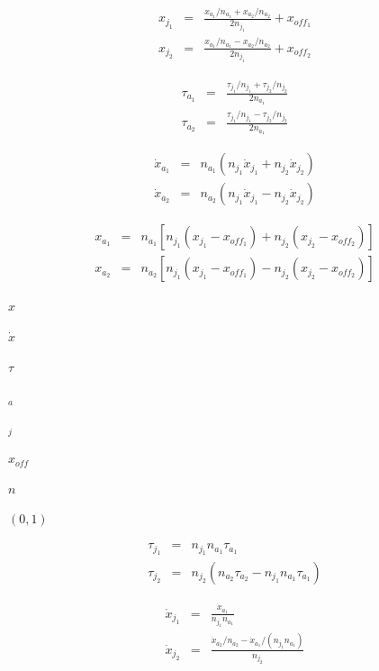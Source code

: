 \documentclass{article}
\begin{document}
\begin{eqnarray*}
x_{j_1} & = & \frac{ x_{a_1} / n_{a_1} + x_{a_2} / n_{a_2} }{2 n_{j_1}}  + x_{off_1} \\[1em]
x_{j_2} & = & \frac{ x_{a_1} / n_{a_1} - x_{a_2} / n_{a_2} }{2 n_{j_1}}  + x_{off_2}
\end{eqnarray*}
\pagebreak

\begin{eqnarray*}
\tau_{a_1} & = & \frac{ \tau_{j_1} / n_{j_1} + \tau_{j_2} / n_{j_2} }{2 n_{a_1}} \\[1em]
\tau_{a_2} & = & \frac{ \tau_{j_1} / n_{j_1} - \tau_{j_2} / n_{j_2} }{2 n_{a_1}}
\end{eqnarray*}
\pagebreak

\begin{eqnarray*}
\dot{x}_{a_1} & = & n_{a_1} ( n_{j_1} \dot{x}_{j_1} + n_{j_2} \dot{x}_{j_2} ) \\[2.5em]
\dot{x}_{a_2} & = & n_{a_2} ( n_{j_1} \dot{x}_{j_1} - n_{j_2} \dot{x}_{j_2} )
\end{eqnarray*}
\pagebreak

\begin{eqnarray*}
x_{a_1} & = & n_{a_1} \left[ n_{j_1} (x_{j_1} - x_{off_1}) + n_{j_2} (x_{j_2} - x_{off_2}) \right] \\[2.5em]
x_{a_2} & = & n_{a_2} \left[ n_{j_1} (x_{j_1} - x_{off_1}) - n_{j_2} (x_{j_2} - x_{off_2}) \right]
\end{eqnarray*}
\pagebreak

$ x $
\pagebreak

$ \dot{x} $
\pagebreak

$ \tau $
\pagebreak

$ _a $
\pagebreak

$ _j $
\pagebreak

$ x_{off}$
\pagebreak

$ n $
\pagebreak

$ (0, 1) $
\pagebreak

\begin{eqnarray*}
\tau_{j_1} & = & n_{j_1} n_{a_1} \tau_{a_1} \\
\tau_{j_2} & = & n_{j_2} (n_{a_2} \tau_{a_2} - n_{j_1} n_{a_1} \tau_{a_1})
\end{eqnarray*}
\pagebreak

\begin{eqnarray*}
\dot{x}_{j_1} & = & \frac{ \dot{x}_{a_1} }{ n_{j_1} n_{a_1} } \\
\dot{x}_{j_2} & = & \frac{ \dot{x}_{a_2} / n_{a_2} - \dot{x}_{a_1} / (n_{j_1} n_{a_1}) }{ n_{j_2} }
\end{eqnarray*}
\pagebreak
\end{document}
